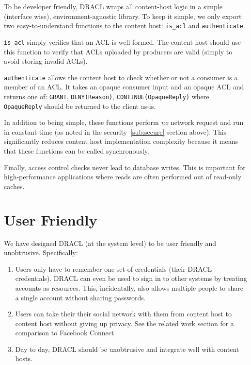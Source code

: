 \documentclass[pdftex,12pt,a4papaer,twoside,notitlepage]{report}
\begin{document}
To be developer friendly, DRACL wraps all content-host logic in a simple
(interface wise), environment-agnostic library. To keep it simple, we only
export two easy-to-understand functions to the content host: \verb=is_acl= and
\verb=authenticate=.

\verb=is_acl= simply verifies that an ACL is well formed. The content host
should use this function to verify that ACLs uploaded by producers are valid
(simply to avoid storing invalid ACLs).

\verb=authenticate= allows the content host to check whether or not a consumer
is a member of an ACL. It takes an opaque consumer input and an opaque ACL and
returns one of: \verb=GRANT=, \verb=DENY(Reason)=, \verb=CONTINUE(OpaqueReply)=
where \verb=OpaqueReply= should be returned to the client as-is.

In addition to being simple, these functions perform \emph{no} network request
and run in constant time (as noted in the security~\ref{sub:secure} section
above). This significantly reduces content host implementation complexity
because it means that these functions can be called synchronously.

Finally, access control checks never lead to database writes. This is important
for high-performance applications where reads are often performed out of
read-only caches.

\section{User Friendly}

We have designed DRACL (at the system level) to be user friendly and
unobtrusive. Specifically:

\begin{enumerate}
  \item Users only have to remember one set of credentials (their DRACL
    credentials). DRACL can even be used to sign in to other systems by treating
    accounts as resources. This, incidentally, also allows multiple people to share
    a single account without sharing passwords.
  \item Users can take their their social network with them from content host to
    content host without giving up privacy. See the related work section for a
    comparison to Facebook Connect\texttrademark~\cite{facebook-connect}
  \item Day to day, DRACL should be unobtrusive and integrate well with content
    hosts.
\end{enumerate}
\end{document}
